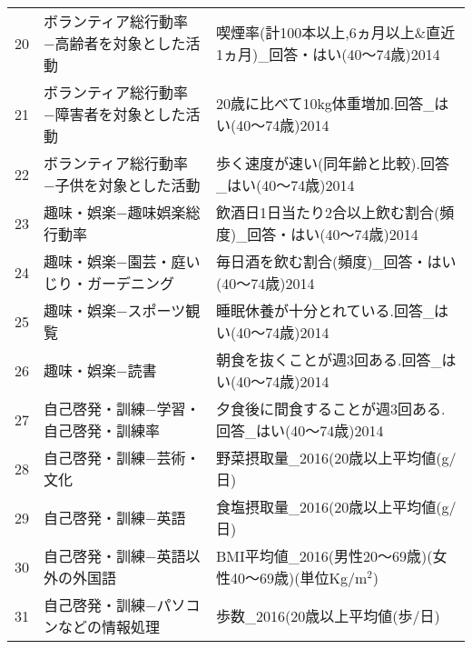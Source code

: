 \begin{table}[ht]
\begin{tabular}{rll}
  20 & ボランティア総行動率−高齢者を対象とした活動 & 喫煙率(計100本以上,6ヵ月以上\&直近1ヵ月)\_回答・はい(40〜74歳)2014 \\ 
  21 & ボランティア総行動率−障害者を対象とした活動 & 20歳に比べて10kg体重増加.回答\_はい(40〜74歳)2014 \\ 
  22 & ボランティア総行動率−子供を対象とした活動 & 歩く速度が速い(同年齢と比較).回答\_はい(40〜74歳)2014 \\ 
  23 & 趣味・娯楽−趣味娯楽総行動率 & 飲酒日1日当たり2合以上飲む割合(頻度)\_回答・はい(40〜74歳)2014 \\ 
  24 & 趣味・娯楽−園芸・庭いじり・ガーデニング & 毎日酒を飲む割合(頻度)\_回答・はい(40〜74歳)2014 \\ 
  25 & 趣味・娯楽−スポーツ観覧 & 睡眠休養が十分とれている.回答\_はい(40〜74歳)2014 \\ 
  26 & 趣味・娯楽−読書 & 朝食を抜くことが週3回ある.回答\_はい(40〜74歳)2014 \\ 
  27 & 自己啓発・訓練−学習・自己啓発・訓練率 & 夕食後に間食することが週3回ある.回答\_はい(40〜74歳)2014 \\ 
  28 & 自己啓発・訓練−芸術・文化 & 野菜摂取量\_2016(20歳以上平均値(g/日) \\ 
  29 & 自己啓発・訓練−英語 & 食塩摂取量\_2016(20歳以上平均値(g/日) \\ 
  30 & 自己啓発・訓練−英語以外の外国語 & BMI平均値\_2016(男性20〜69歳)(女性40〜69歳)(単位Kg/m$^2$) \\ 
  31 & 自己啓発・訓練−パソコンなどの情報処理 & 歩数\_2016(20歳以上平均値(歩/日) \\ 
   \hline
\end{tabular}
\endgroup
\end{table}
